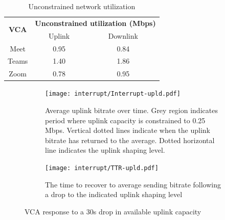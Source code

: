 \begin{table}[]
\centering
\begin{tabular}{|c|c|c|}
\hline
\multirow{2}{*}{\textbf{VCA}} & \multicolumn{2}{c|}{\textbf{Unconstrained utilization (Mbps)}} \\ \cline{2-3} 
                              & Uplink                        & Downlink                       \\ \hline
Meet                          & 0.95                          & 0.84                           \\ \hline
Teams                         & 1.40                           & 1.86                           \\ \hline
Zoom                          & 0.78                          & 0.95                           \\ \hline
\end{tabular}
\caption{Unconstrained network utilization}
\label{tab:vca_static}
\end{table}

\begin{figure}[h!]
\begin{subfigure}[t]{.5\textwidth}
    \centering
    \texttt{[image: interrupt/Interrupt-upld.pdf]}
    \captionsetup{width=.9\linewidth}
    \caption{Average uplink bitrate over time. Grey region indicates period where uplink capacity is constrained to 0.25 Mbps. Vertical dotted lines indicate when the uplink bitrate has returned to the average. Dotted horizontal line indicates the uplink shaping level.}
    \label{fig:ts_upld}
\end{subfigure}\hfill
\begin{subfigure}[t]{.5\textwidth}
      \centering
    \texttt{[image: interrupt/TTR-upld.pdf]}
    \captionsetup{width=.9\linewidth}
    \caption{The time to recover to average sending bitrate following a drop to the indicated uplink shaping level}
    \label{fig:TTR_upld}
\end{subfigure}
\caption{VCA response to a 30s drop in available uplink capacity}
\label{fig:interrupt-upld}
\end{figure}



